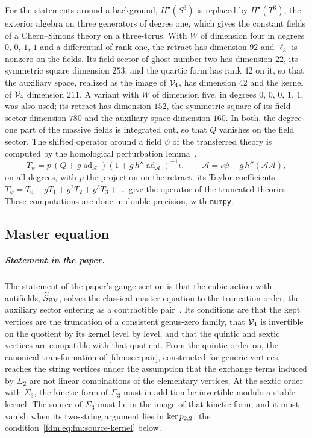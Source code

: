 For the statements around a background, $H^\bullet(S^3)$ is replaced by $H^\bullet(T^3)$, the exterior algebra on three generators of degree one, which gives the constant fields of a Chern--Simons theory on a three-torus.
With $W$ of dimension four in degrees $0$, $0$, $1$, $1$ and a differential of rank one, the retract has dimension $92$ and $\ell_3$ is nonzero on the fields.
Its field sector of ghost number two has dimension $22$, its symmetric square dimension $253$, and the quartic form has rank $42$ on it, so that the auxiliary space, realized as the image of $\vertex{4}$, has dimension $42$ and the kernel of $\vertex{4}$ dimension $211$.
A variant with $W$ of dimension five, in degrees $0$, $0$, $0$, $1$, $1$, was also used; its retract has dimension $152$, the symmetric square of its field sector dimension $780$ and the auxiliary space dimension $160$.
In both, the degree-one part of the massive fields is integrated out, so that $Q$ vanishes on the field sector.
The shifted operator around a field $\psi$ of the transferred theory is computed by the homological perturbation lemma~\cite{Crainic:2004:PerturbationLemmaDeformations},
\begin{equation}
  \label{fdm:eq:cs:shifted}
  T_\psi
    = p \, (Q + g \operatorname{ad}_{\mathcal A}) (1 + g \, h'' \operatorname{ad}_{\mathcal A})^{-1} \iota,
  \qquad
  \mathcal A
    = \iota \psi - g \, h''(\mathcal A \mathcal A),
\end{equation}
on all degrees, with $p$ the projection on the retract; its Taylor coefficients $T_\psi = T_0 + g T_1 + g^2 T_2 + g^3 T_3 + \dots$ give the operator of the truncated theories.
These computations are done in double precision, with \texttt{numpy}.

\subsection{Master equation}
\label{fdm:sec:master}

\subparagraph{Statement in the paper.}
The statement of the paper's gauge section is that the cubic action with antifields, $\caction[\mathrm{BV}]$, solves the classical master equation to the truncation order, the auxiliary sector entering as a contractible pair~\cite{Henneaux:1990:EliminationAuxiliaryFields}.
Its conditions are that the kept vertices are the truncation of a consistent genus-zero family, that $\vertex{4}$ is invertible on the quotient by its kernel level by level, and that the quintic and sextic vertices are compatible with that quotient.
From the quintic order on, the canonical transformation of \cref{fdm:sec:pair}, constructed for generic vertices, reaches the string vertices under the assumption that the exchange terms induced by $\Sigma_2$ are not linear combinations of the elementary vertices.
At the sextic order with $\Sigma_3$, the kinetic form of $\Sigma_3$ must in addition be invertible modulo a stable kernel.
The source of $\Sigma_3$ must lie in the image of that kinetic form, and it must vanish when its two-string argument lies in $\ker \sprod{2}{2}$, the condition~\eqref{fdm:eq:fm:source-kernel} below.

